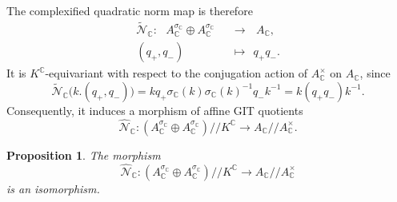 \documentclass[oneside,11pt]{amsart}
\newtheorem{prop}[thm]{Proposition}
\theoremstyle{definition}
\theoremstyle{remark}
\numberwithin{thm}{section}
\numberwithin{equation}{section}
\begin{document}
The complexified quadratic norm map is therefore
\begin{align*}
\tilde{\mathcal{N}}_{\mathbb C} :\ \ \ 
A_{\mathbb C}^{\sigma_{\mathbb C}}\oplus A_{\mathbb C}^{\sigma_{\mathbb C}}\  &\ \ \longrightarrow\ \ \ A_{\mathbb C},\\
(q_+,q_-) \ \ &\ \ \longmapsto\ \ q_+q_-.
\end{align*}
It is $K^{\mathbb C}$-equivariant with respect to the conjugation action of $A_{\mathbb C}^{\times}$ on $A_{\mathbb C}$, since
\[
\tilde{\mathcal{N}}_{\mathbb C}\bigl(k.(q_+,q_-)\bigr)=
kq_+\sigma_{\mathbb C}(k)\sigma_{\mathbb C}(k)^{-1}q_-k^{-1}=k(q_+q_-)k^{-1}.
\]
Consequently, it induces a morphism of affine GIT quotients
\[
\hat{\mathcal{N}}_{\mathbb C}: (A_{\mathbb C}^{\sigma_{\mathbb C}}\oplus A_{\mathbb C}^{\sigma_{\mathbb C}})/\!\!/K^{\mathbb C}
\longrightarrow A_{\mathbb C}/\!\!/A_{\mathbb C}^{\times}.
\]

\begin{prop}
The morphism
\[
\hat{\mathcal{N}}_{\mathbb C}: (A_{\mathbb C}^{\sigma_{\mathbb C}}\oplus A_{\mathbb C}^{\sigma_{\mathbb C}})/\!\!/K^{\mathbb C}
\longrightarrow A_{\mathbb C}/\!\!/A_{\mathbb C}^{\times}
\]
is an isomorphism.
\end{prop}
\end{document}
